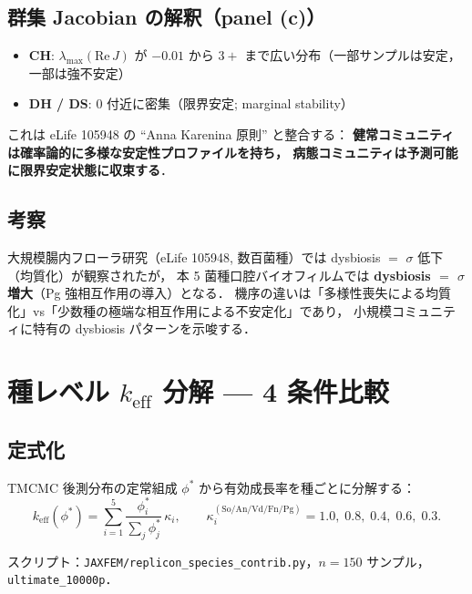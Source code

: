 \documentclass[12pt, a4paper]{article}
\begin{document}
\subsection{群集 Jacobian の解釈（panel (c)）}

\begin{itemize}[noitemsep]
  \item \textbf{CH}: $\lambda_\mathrm{max}(\mathrm{Re}\,J)$ が $-0.01$ から $3+$ まで広い分布（一部サンプルは安定，一部は強不安定）
  \item \textbf{DH / DS}: $0$ 付近に密集（限界安定; marginal stability）
\end{itemize}

これは eLife 105948 の ``Anna Karenina 原則'' と整合する：
\textbf{健常コミュニティは確率論的に多様な安定性プロファイルを持ち，
病態コミュニティは予測可能に限界安定状態に収束する}．

\subsection{考察}

大規模腸内フローラ研究（eLife 105948, 数百菌種）では dysbiosis $=$ $\sigma$ 低下（均質化）が観察されたが，
本 5 菌種口腔バイオフィルムでは \textbf{dysbiosis $=$ $\sigma$ 増大}（Pg 強相互作用の導入）となる．
機序の違いは「多様性喪失による均質化」vs「少数種の極端な相互作用による不安定化」であり，
小規模コミュニティに特有の dysbiosis パターンを示唆する．

\section{種レベル $k_\mathrm{eff}$ 分解 — 4 条件比較}

\subsection{定式化}

TMCMC 後測分布の定常組成 $\phi^*$ から有効成長率を種ごとに分解する：
\begin{equation}
  k_\mathrm{eff}(\phi^*)
  = \sum_{i=1}^{5} \frac{\phi_i^*}{\sum_j \phi_j^*}\,\kappa_i,
  \qquad
  \kappa_i^{(\mathrm{So/An/Vd/Fn/Pg})} = 1.0,\;0.8,\;0.4,\;0.6,\;0.3.
\end{equation}

スクリプト：\texttt{JAXFEM/replicon\_species\_contrib.py}，$n=150$ サンプル，\texttt{ultimate\_10000p}．
\end{document}
